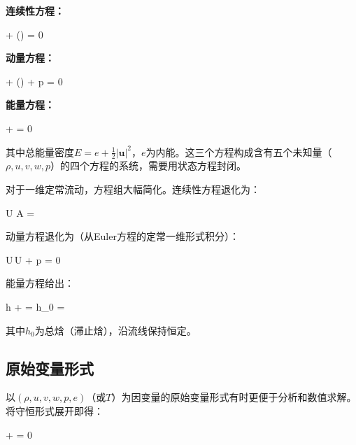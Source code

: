 \vspace{4pt}
\noindent\textbf{连续性方程：}

\begin{myformula}
 + \nabla\cdot(\rho{}) = 0
\end{myformula}

\noindent\textbf{动量方程：}

\begin{myformula}
 + \nabla\cdot(\rho{}\otimes{}) + \nabla p = 0
\end{myformula}

\noindent\textbf{能量方程：}

\begin{myformula}
 + \nabla{} = 0
\end{myformula}

\vspace{4pt}

其中总能量密度$E = e + \frac{1}{2}|\mathbf{u}|^{2}$，$e$为内能。这三个方程构成含有五个未知量（$\rho,u,v,w,p$）的四个方程的系统，需要用状态方程封闭。

对于一维定常流动，方程组大幅简化。连续性方程退化为：

\begin{myformula}
\rho U A = 
\end{myformula}

动量方程退化为（从Euler方程的定常一维形式积分）：

\begin{myformula}
\rho U\,U + p = 0
\end{myformula}

能量方程给出：

\begin{myformula}
h +  = h_0 = 
\end{myformula}

其中$h_0$为总焓（滞止焓），沿流线保持恒定。

\subsection{原始变量形式}

以$(\rho,u,v,w,p,e)$（或$T$）为因变量的原始变量形式有时更便于分析和数值求解。将守恒形式展开即得：

\begin{myformula}
 + \rho\nabla\cdot{} = 0
\end{myformula}

